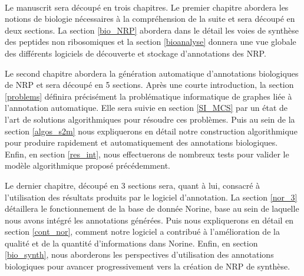 ~~

Le manuscrit sera découpé en trois chapitres.
Le premier chapitre abordera les notions de biologie nécessaires à la compréhension de la suite et sera découpé en deux sections.
La section \ref{bio_NRP} abordera dans le détail les voies de synthèse des peptides non ribosomiques et la section \ref{bioanalyse} donnera une vue globale des différents logiciels de découverte et stockage d'annotations des NRP.

Le second chapitre abordera la génération automatique d'annotations biologiques de NRP et sera découpé en 5 sections.
Après une courte introduction, la section \ref{problems} définira précisément la problématique informatique de graphes liée à l'annotation automatique.
Elle sera suivie en section \ref{SI_MCS} par un état de l'art de solutions algorithmiques pour résoudre ces problèmes.
Puis au sein de la section \ref{algos_s2m} nous expliquerons en détail notre construction algorithmique pour produire rapidement et automatiquement des annotations biologiques.
Enfin, en section \ref{res_int}, nous effectuerons de nombreux tests pour valider le modèle algorithmique proposé précédemment.

Le dernier chapitre, découpé en 3 sections sera, quant à lui, consacré à l'utilisation des résultats produits par le logiciel d'annotation.
La section \ref{nor_3} détaillera le fonctionnement de la base de donnée Norine, base au sein de laquelle nous avons intégré les annotations générées.
Puis nous expliquerons en détail en section \ref{cont_nor}, comment notre logiciel a contribué à l'amélioration de la qualité et de la quantité d'informations dans Norine.
Enfin, en section \ref{bio_synth}, nous aborderons les perspectives d'utilisation des annotations biologiques pour avancer progressivement vers la création de NRP de synthèse.